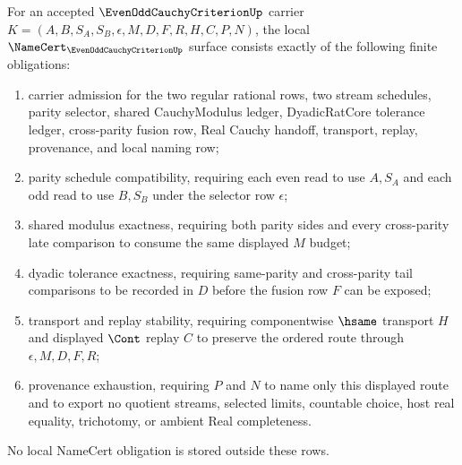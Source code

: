 \begin{theorem}
\label{thm:even-odd-cauchy-criterion-namecert-obligations}
For an accepted $\EvenOddCauchyCriterionUp$ carrier $K=(A,B,S_A,S_B,\epsilon,M,D,F,R,H,C,P,N)$, the local $\NameCert_{\EvenOddCauchyCriterionUp}$ surface consists exactly of the following finite obligations:
\begin{enumerate}
\item carrier admission for the two regular rational rows, two stream schedules, parity selector, shared CauchyModulus ledger, DyadicRatCore tolerance ledger, cross-parity fusion row, Real Cauchy handoff, transport, replay, provenance, and local naming row;
\item parity schedule compatibility, requiring each even read to use $A,S_A$ and each odd read to use $B,S_B$ under the selector row $\epsilon$;
\item shared modulus exactness, requiring both parity sides and every cross-parity late comparison to consume the same displayed $M$ budget;
\item dyadic tolerance exactness, requiring same-parity and cross-parity tail comparisons to be recorded in $D$ before the fusion row $F$ can be exposed;
\item transport and replay stability, requiring componentwise $\hsame$ transport $H$ and displayed $\Cont$ replay $C$ to preserve the ordered route through $\epsilon,M,D,F,R$;
\item provenance exhaustion, requiring $P$ and $N$ to name only this displayed route and to export no quotient streams, selected limits, countable choice, host real equality, trichotomy, or ambient Real completeness.
\end{enumerate}
No local NameCert obligation is stored outside these rows.
\end{theorem}
